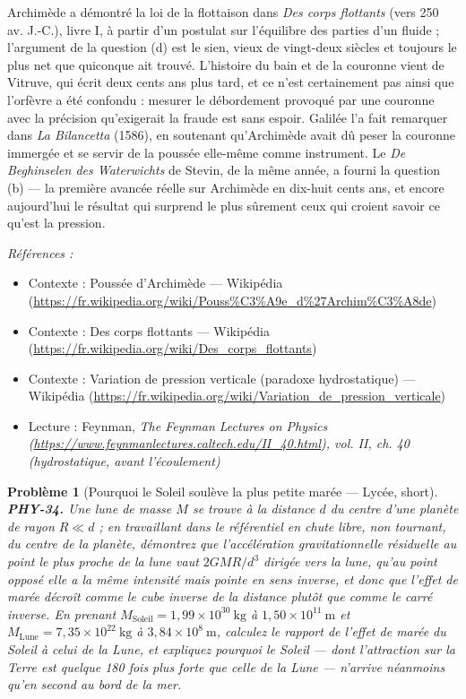 \documentclass[11pt]{article}
\newtheorem{problem}{Problème}
\newenvironment{refs}{\par\small\noindent\emph{Références :}\begin{itemize}\setlength\itemsep{0pt}}{\end{itemize}\normalsize}
\begin{document}
\noindent Archimède a démontré la loi de la flottaison dans \textit{Des corps flottants}
(vers 250 av. J.-C.), livre I, à partir d'un postulat sur l'équilibre des parties d'un fluide ;
l'argument de la question (d) est le sien, vieux de vingt-deux siècles et toujours le plus net
que quiconque ait trouvé. L'histoire du bain et de la couronne vient de Vitruve, qui écrit deux
cents ans plus tard, et ce n'est certainement pas ainsi que l'orfèvre a été confondu : mesurer le
débordement provoqué par une couronne avec la précision qu'exigerait la fraude est sans espoir.
Galilée l'a fait remarquer dans \textit{La Bilancetta} (1586), en soutenant qu'Archimède avait dû
peser la couronne immergée et se servir de la poussée elle-même comme instrument. Le
\textit{De Beghinselen des Waterwichts} de Stevin, de la même année, a fourni la question (b) --- la
première avancée réelle sur Archimède en dix-huit cents ans, et encore aujourd'hui le résultat
qui surprend le plus sûrement ceux qui croient savoir ce qu'est la pression.

\begin{refs}
\item Contexte : Poussée d'Archimède --- Wikipédia (\url{https://fr.wikipedia.org/wiki/Pouss%C3%A9e_d%27Archim%C3%A8de})
\item Contexte : Des corps flottants --- Wikipédia (\url{https://fr.wikipedia.org/wiki/Des_corps_flottants})
\item Contexte : Variation de pression verticale (paradoxe hydrostatique) --- Wikipédia (\url{https://fr.wikipedia.org/wiki/Variation_de_pression_verticale})
\item Lecture : Feynman, \textit{The Feynman Lectures on Physics (\url{https://www.feynmanlectures.caltech.edu/II_40.html}), vol. II, ch. 40 (hydrostatique, avant l'écoulement)}
\end{refs}

\bigskip

\begin{problem}[{Pourquoi le Soleil soulève la plus petite marée --- Lycée, short}]
\textbf{PHY-34.} Une lune de masse $ M $ se trouve à la distance $ d $ du
centre d'une planète de rayon $ R \ll d $ ; en travaillant dans le référentiel en chute libre,
non tournant, du centre de la planète, démontrez que l'accélération gravitationnelle résiduelle
au point le plus proche de la lune vaut $ 2GMR/d^{3} $ dirigée vers la lune, qu'au point
opposé elle a la même intensité mais pointe en sens inverse, et donc que l'effet de marée décroît
comme le \textit{cube} inverse de la distance plutôt que comme le carré inverse. En prenant
$ M_{\text{Soleil}} = 1{,}99\times 10^{30}\ \mathrm{kg} $ à
$ 1{,}50\times 10^{11}\ \mathrm{m} $ et $ M_{\text{Lune}} = 7{,}35\times 10^{22}\
\mathrm{kg} $ à $ 3{,}84\times 10^{8}\ \mathrm{m} $, calculez le rapport de l'effet de marée
du Soleil à celui de la Lune, et expliquez pourquoi le Soleil --- dont l'attraction sur la Terre
est quelque 180 fois plus forte que celle de la Lune --- n'arrive néanmoins qu'en second au bord de
la mer.
\end{problem}
\end{document}
